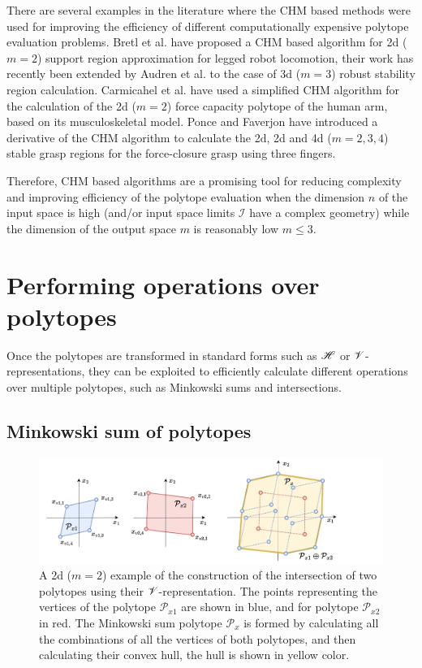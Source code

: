 There are several examples in the literature where the CHM based methods were used for improving the efficiency of different computationally expensive polytope evaluation problems. Bretl et al. \cite{Bretl2008} have proposed a CHM based algorithm for 2d ($m\!=\!2$) support region approximation for legged robot locomotion, their work has recently been extended by Audren et al. \cite{Herve2018} to the case of 3d ($m\!=\!3$) robust stability region calculation. Carmicahel et al. \cite{carmichael2011Towards, carmichael_estimating_2013} have used a simplified CHM algorithm for the calculation of the 2d ($m\!=\!2$) force capacity polytope of the human arm, based on its musculoskeletal model. Ponce and Faverjon \cite{Ponce1995} have introduced a derivative of the CHM algorithm to calculate the 2d, 2d and 4d ($m\!=\!2,3,4$) stable grasp regions for the force-closure grasp using three fingers. 

Therefore, CHM based algorithms are a promising tool for reducing complexity and improving efficiency of the polytope evaluation when the dimension $n$ of the input space is high (and/or input space limits $\mathcal{I}$ have a complex geometry) while the dimension of the output space $m$ is reasonably low $m\leq3$.


\section{Performing operations over polytopes}
\label{ch:operations_over_poly_stategies}

Once the polytopes are transformed in standard forms such as $\mathscr{H}$ or $\mathscr{V}$-representations, they can be exploited to efficiently calculate different operations over multiple polytopes, such as Minkowski sums  and intersections.

\subsection{Minkowski sum of polytopes}
\begin{figure}[!h]
    \centering
    \includegraphics[width=0.9\linewidth]{Chapters/imgs/polytope_minkowski_sum.pdf}
    \caption{A 2d ($m\!=\!2$) example of the construction of the intersection of two polytopes using their $\mathscr{V}$-representation. The points representing the vertices of the polytope $\mathcal{P}_{x1}$ are shown in blue, and for polytope $\mathcal{P}_{x2}$ in red. The Minkowski sum polytope $\mathcal{P}_x$ is formed by calculating all the combinations of all the vertices of both polytopes, and then calculating their convex hull, the hull is shown in yellow color.}
    \label{fig:collab_sum_solution}
\end{figure}


